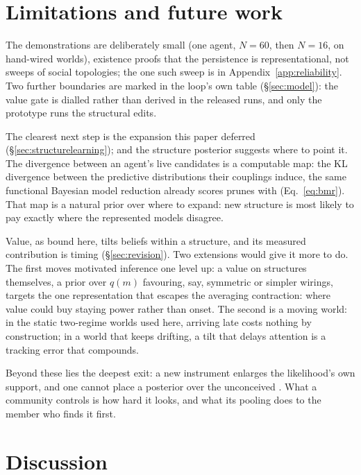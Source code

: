 \documentclass[runningheads]{llncs}
\begin{document}
\section{Limitations and future work}
\label{sec:limitations}

The demonstrations are deliberately small (one agent, $N=60$, then $N=16$, on hand-wired
worlds), existence proofs that the persistence is representational, not sweeps of social
topologies; the one such sweep is in Appendix~\ref{app:reliability}. Two further boundaries
are marked in the loop's own
table (\S\ref{sec:model}): the value gate is dialled rather than derived in the
released runs, and only the prototype runs the structural edits.

The clearest next step is the expansion this paper deferred
(\S\ref{sec:structurelearning}); and the structure posterior suggests where to point it. The
divergence between an agent's live candidates is a computable map: the KL divergence between
the predictive distributions their couplings induce, the same functional Bayesian model
reduction already scores prunes with (Eq.~\ref{eq:bmr}). That map is a natural prior
over where to expand: new structure is most likely to pay exactly where the represented
models disagree.

Value, as bound here, tilts beliefs within a structure, and its measured contribution
is timing (\S\ref{sec:revision}). Two extensions would give it more to do. The first moves motivated
inference one level up: a value on structures themselves, a prior over $q(m)$
favouring, say, symmetric or simpler wirings, targets the one representation that escapes
the averaging contraction: where value could buy staying power rather than onset. The second
is a moving world: in the static two-regime worlds used here, arriving late
costs nothing by construction; in a world that keeps drifting, a tilt that delays attention
is a tracking error that compounds.

Beyond these lies the deepest exit: a new instrument enlarges the
likelihood's own support, and one cannot place a posterior over the unconceived
\citep{stanford2006}. What a community controls is how hard it looks, and what its pooling
does to the member who finds it first.

\section{Discussion}
\label{sec:discussion}
\end{document}
